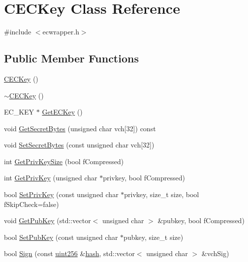 \hypertarget{class_c_e_c_key}{}\section{C\+E\+C\+Key Class Reference}
\label{class_c_e_c_key}


{\ttfamily \#include $<$ecwrapper.\+h$>$}

\subsection*{Public Member Functions}
\begin{DoxyCompactItemize}
\item 
\hyperlink{class_c_e_c_key_a5ee51ce7e5435b8d337913540947e58a}{C\+E\+C\+Key} ()
\item 
\hyperlink{class_c_e_c_key_abc742c7fb8362b693745eeb76324dbde}{$\sim$\+C\+E\+C\+Key} ()
\item 
E\+C\+\_\+\+K\+E\+Y $\ast$ \hyperlink{class_c_e_c_key_a1a2e6828d8d29d2919d8377cbb14933a}{Get\+E\+C\+Key} ()
\item 
void \hyperlink{class_c_e_c_key_adff4951e1273996177ba4361b71c666b}{Get\+Secret\+Bytes} (unsigned char vch\mbox{[}32\mbox{]}) const 
\item 
void \hyperlink{class_c_e_c_key_a4f5a374f5aaa622749b7772392c2ef30}{Set\+Secret\+Bytes} (const unsigned char vch\mbox{[}32\mbox{]})
\item 
int \hyperlink{class_c_e_c_key_ab2f0dea297ce8546ebb5bb0478c1e7a0}{Get\+Priv\+Key\+Size} (bool f\+Compressed)
\item 
int \hyperlink{class_c_e_c_key_a3f6c872fae22de283c2cd7a15b0327ea}{Get\+Priv\+Key} (unsigned char $\ast$privkey, bool f\+Compressed)
\item 
bool \hyperlink{class_c_e_c_key_a9d81b04876307c2e13df32798fe264a3}{Set\+Priv\+Key} (const unsigned char $\ast$privkey, size\+\_\+t size, bool f\+Skip\+Check=false)
\item 
void \hyperlink{class_c_e_c_key_ab3cb52ca6bf3bdd55be9152a76da9112}{Get\+Pub\+Key} (std\+::vector$<$ unsigned char $>$ \&pubkey, bool f\+Compressed)
\item 
bool \hyperlink{class_c_e_c_key_a07055de929aa6e4f4b692fb2bd272fdd}{Set\+Pub\+Key} (const unsigned char $\ast$pubkey, size\+\_\+t size)
\item 
bool \hyperlink{class_c_e_c_key_abb845b49a9befd527a568b2b39271d37}{Sign} (const \hyperlink{classuint256}{uint256} \&\hyperlink{cache_8cc_a11ecb029164e055f28f4123ce3748862}{hash}, std\+::vector$<$ unsigned char $>$ \&vch\+Sig)

\end{DoxyCompactItemize}
